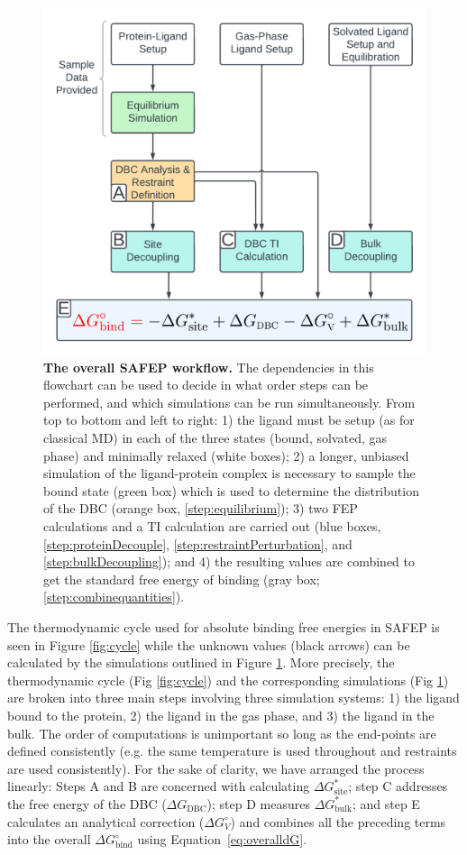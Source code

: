 \documentclass[9pt,tutorial]{Styling/livecoms}
\begin{document}
\begin{figure}[h]
    \centering
    \includegraphics[width=.9\linewidth]{CoarseGrainedWorkflow.pdf}
    \caption[test]{\textbf{The overall SAFEP workflow.} The dependencies in this flowchart can be used to decide in what order steps can be performed, and which simulations can be run simultaneously. From top to bottom and left to right: 1) the ligand must be setup (as for classical MD) in each of the three states (bound, solvated, gas phase) and minimally relaxed (white boxes); 2) a longer, unbiased simulation of the ligand-protein complex is necessary to sample the bound state (green box) which is used to determine the distribution of the DBC (orange box, \ref{step:equilibrium}); 3) two FEP calculations and a TI calculation are carried out (blue boxes, \ref{step:proteinDecouple}, \ref{step:restraintPerturbation}, and \ref{step:bulkDecoupling}); and 4) the resulting values are combined to get the standard free energy of binding (gray box; \ref{step:combinequantities}).}
    \label{fig:workflow}
\end{figure}

The thermodynamic cycle used for absolute binding free energies in SAFEP is seen in Figure \ref{fig:cycle} while the unknown values (black arrows) can be calculated by the simulations outlined in Figure \ref{fig:workflow}.
More precisely, the thermodynamic cycle (Fig \ref{fig:cycle}) and the corresponding simulations (Fig \ref{fig:workflow}) are broken into three main steps involving three simulation systems: 1) the ligand bound to the protein, 2) the ligand in the gas phase, and 3) the ligand in the bulk. 
The order of computations is unimportant so long as the end-points are defined consistently (e.g. the same temperature is used throughout and restraints are used consistently). 
For the sake of clarity, we have arranged the process linearly: Steps A and B are concerned with calculating $\Delta G^*_\mathrm{site}$; step C addresses the free energy of the DBC ($\Delta G_\mathrm{DBC}$); step D measures $\Delta G^*_\mathrm{bulk}$; and step E calculates an analytical correction ($\Delta G^\circ_V$) and combines all the preceding terms into the overall $\Delta G^\circ_\mathrm{bind}$ using Equation~\ref{eq:overalldG}.
\end{document}

